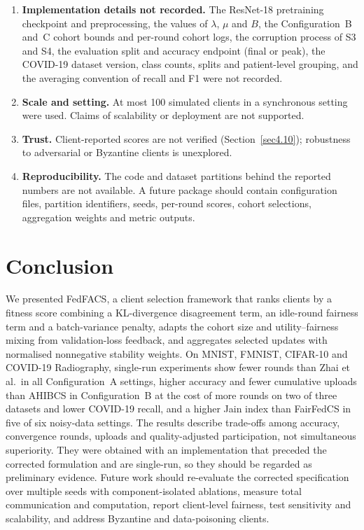 \documentclass[pdflatex,sn-basic]{sn-jnl}
\begin{document}
\begin{enumerate}
\item \textbf{Implementation details not recorded.} The ResNet-18 pretraining checkpoint and preprocessing, the values of $\lambda$, $\mu$ and $B$, the Configuration~B and~C cohort bounds and per-round cohort logs, the corruption process of S3 and S4, the evaluation split and accuracy endpoint (final or peak), the COVID-19 dataset version, class counts, splits and patient-level grouping, and the averaging convention of recall and F1 were not recorded.
\item \textbf{Scale and setting.} At most 100 simulated clients in a synchronous setting were used. Claims of scalability or deployment are not supported.
\item \textbf{Trust.} Client-reported scores are not verified (Section~\ref{sec4.10}); robustness to adversarial or Byzantine clients is unexplored.
\item \textbf{Reproducibility.} The code and dataset partitions behind the reported numbers are not available. A future package should contain configuration files, partition identifiers, seeds, per-round scores, cohort selections, aggregation weights and metric outputs.
\end{enumerate}

\section{Conclusion}\label{sec7}
We presented FedFACS, a client selection framework that ranks clients by a fitness score combining a KL-divergence disagreement term, an idle-round fairness term and a batch-variance penalty, adapts the cohort size and utility--fairness mixing from validation-loss feedback, and aggregates selected updates with normalised nonnegative stability weights. On MNIST, FMNIST, CIFAR-10 and COVID-19 Radiography, single-run experiments show fewer rounds than Zhai et al.\ in all Configuration~A settings, higher accuracy and fewer cumulative uploads than AHIBCS in Configuration~B at the cost of more rounds on two of three datasets and lower COVID-19 recall, and a higher Jain index than FairFedCS in five of six noisy-data settings. The results describe trade-offs among accuracy, convergence rounds, uploads and quality-adjusted participation, not simultaneous superiority. They were obtained with an implementation that preceded the corrected formulation and are single-run, so they should be regarded as preliminary evidence. Future work should re-evaluate the corrected specification over multiple seeds with component-isolated ablations, measure total communication and computation, report client-level fairness, test sensitivity and scalability, and address Byzantine and data-poisoning clients.
\end{document}
